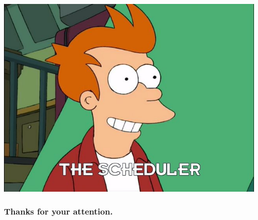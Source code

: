 \documentclass{beamer}
\begin{document}
\begin{frame}

\begin{center}
  \includegraphics[height=0.7\textheight]{resources/fry-scheduler.jpg}
\end{center}

\end{frame}


\begin{frame}
  \frametitle{Thanks for your attention.}
\end{frame}
\end{document}

